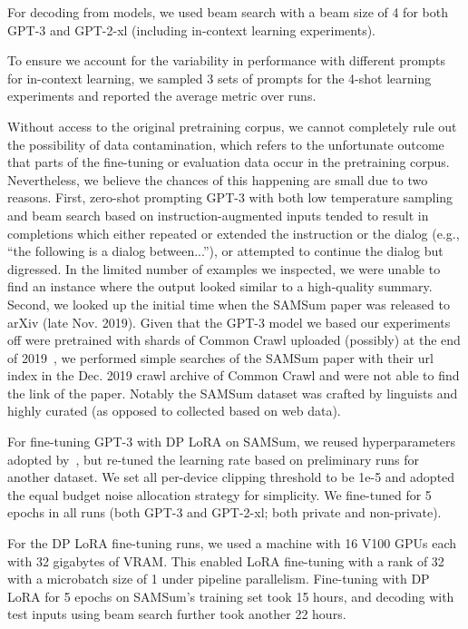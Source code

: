 For decoding from models, we used beam search with a beam size of 4 for both GPT-3 and GPT-2-xl (including in-context learning experiments). 

To ensure we account for the variability in performance with different prompts for in-context learning, we sampled 3 sets of prompts for the 4-shot learning experiments and reported the average metric over runs. 

Without access to the original pretraining corpus, we cannot completely rule out the possibility of data contamination, which refers to the unfortunate outcome that parts of the fine-tuning or evaluation data occur in the pretraining corpus.
Nevertheless, we believe the chances of this happening are small due to two reasons. 
First, zero-shot prompting GPT-3 with both low temperature sampling and beam search based on instruction-augmented inputs tended to result in completions which either repeated or extended the instruction or the dialog (e.g., ``the following is a dialog between...''), or attempted to continue the dialog but digressed. 
In the limited number of examples we inspected, we were unable to find an instance where the output looked similar to a high-quality summary. Second, we looked up the initial time when the SAMSum paper was released to arXiv (late Nov. 2019). 
Given that the GPT-3 model we based our experiments off were pretrained with shards of Common Crawl uploaded (possibly) at the end of 2019~\citep{brown2020language}, we performed simple searches of the SAMSum paper with their url index in the Dec. 2019 crawl archive of Common Crawl and were not able to find the link of the paper.
Notably the SAMSum dataset was crafted by linguists and highly curated (as opposed to collected based on web data). 

For fine-tuning GPT-3 with DP LoRA on SAMSum, we reused hyperparameters adopted by~\cite{hu2021lora}, but re-tuned the learning rate based on preliminary runs for another dataset.
We set all per-device clipping threshold to be 1e-5 and adopted the equal budget noise allocation strategy for simplicity. 
We fine-tuned for 5 epochs in all runs (both GPT-3 and GPT-2-xl; both private and non-private).

For the DP LoRA fine-tuning runs, we used a machine with 16 V100 GPUs each with 32 gigabytes of VRAM. 
This enabled LoRA fine-tuning with a rank of 32 with a microbatch size of 1 under pipeline parallelism.
Fine-tuning with DP LoRA for 5 epochs on SAMSum's training set took 15 hours, and decoding with test inputs using beam search further took another 22 hours. 
